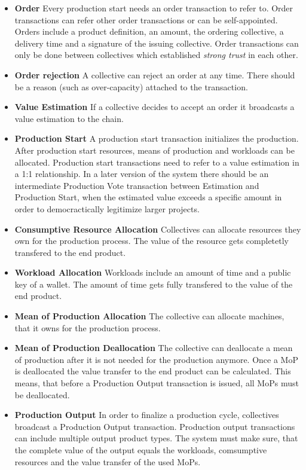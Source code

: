 \documentclass[11pt]{article}
\begin{document}
\begin{itemize}
\item \textbf{Order} Every production start needs an order transaction to refer to. Order transactions can refer other order transactions or can be self-appointed. Orders include a product definition, an amount, the ordering collective, a delivery time and a signature of the issuing collective. Order transactions can only be done between collectives which established \emph{strong trust} in each other.
\item \textbf{Order rejection} A collective can reject an order at any time. There should be a reason (such as over-capacity) attached to the transaction.  
\item \textbf{Value Estimation} If a collective decides to accept an order it broadcasts a value estimation to the chain.
\item \textbf{Production Start} A production start transaction initializes the production. After production start resources, means of production and workloads can be allocated. Production start transactions need to refer to a value estimation in a 1:1 relationship. In a later version of the system there should be an intermediate Production Vote transaction between Estimation and Production Start, when the estimated value exceeds a specific amount in order to democractically legitimize larger projects.

\item \textbf{Consumptive Resource Allocation} Collectives can allocate resources they own for the production process. The value of the resource gets completetly transfered to the end product.

\item \textbf{Workload Allocation} Workloads include an amount of time and a public key of a wallet. The amount of time gets fully transfered to the value of the end product.

\item \textbf{Mean of Production Allocation} The collective can allocate machines, that it owns for the production process. 

\item \textbf{Mean of Production Deallocation} The collective can deallocate a mean of production after it is not needed for the production anymore. Once a MoP is deallocated the value transfer to the end product can be calculated. This means, that before a Production Output transaction is issued, all MoPs must be deallocated.

\item \textbf{Production Output} In order to finalize a production cycle, collectives broadcast a Production Output transaction. Production output transactions can include multiple output product types. The system must make sure, that the complete value of the output equals the workloads, comsumptive resources and the value transfer of the used MoPs.
\end{itemize}
\end{document}
